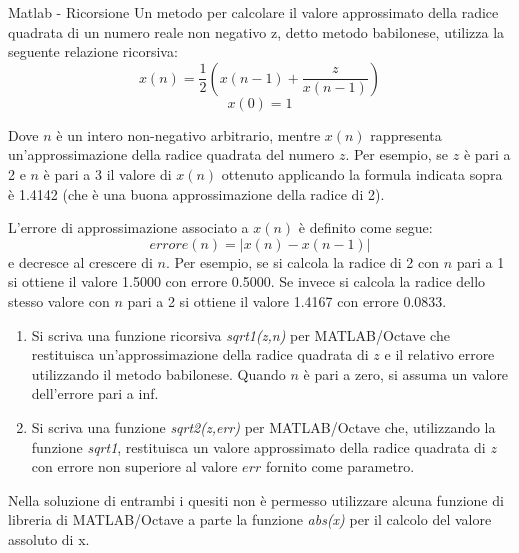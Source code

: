 \begin{frame}[allowframebreaks]{Matlab - Ricorsione}
    Un metodo per calcolare il valore approssimato della radice quadrata di un
    numero reale non negativo z, detto metodo babilonese, utilizza la seguente
    relazione ricorsiva:
    \[x(n) = \frac{1}{2}(x(n-1)+\frac{z}{x(n-1)})\]
    \[x(0)=1\]

    Dove $n$ è un intero non-negativo arbitrario, mentre $x(n)$ rappresenta un'approssimazione della radice quadrata del numero $z$. Per esempio, se $z$ è pari a 2 e $n$ è pari a 3 il valore di $x(n)$ ottenuto applicando la formula indicata sopra è 1.4142 (che è una buona approssimazione della radice di 2).

    \framebreak

    L'errore di approssimazione associato a $x(n)$ è definito come segue:
    \[errore(n) = | x(n) - x(n-1)|\]
    e decresce al crescere di $n$. Per esempio, se si calcola la radice di 2 con $n$ pari a 1 si ottiene il valore 1.5000 con errore 0.5000. Se invece si calcola la radice dello stesso valore con $n$ pari a 2 si ottiene il valore 1.4167 con errore 0.0833.

    \framebreak

    \begin{enumerate}
        \item Si scriva una funzione ricorsiva \emph{sqrt1(z,n)} per MATLAB/Octave che
            restituisca un'approssimazione della radice quadrata di $z$ e il relativo errore utilizzando il metodo babilonese. Quando $n$ è pari a zero, si assuma un valore dell’errore pari a inf.
        \item Si scriva una funzione \emph{sqrt2(z,err)} per MATLAB/Octave che, utilizzando la funzione \emph{sqrt1}, restituisca un valore approssimato della radice quadrata di $z$ con errore non superiore al valore $err$ fornito come parametro.
    \end{enumerate}

    Nella soluzione di entrambi i quesiti non è permesso utilizzare alcuna funzione di
    libreria di MATLAB/Octave a parte la funzione \emph{abs(x)} per il calcolo del valore
    assoluto di x.
\end{frame}

